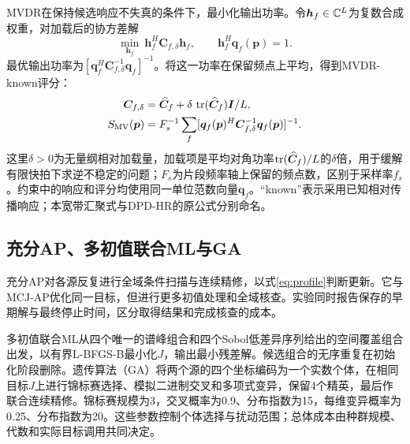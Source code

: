 MVDR在保持候选响应不失真的条件下，最小化输出功率\cite{Capon1969}。令$\bm h_f\in\mathbb C^L$为复数合成权重，对加载后的协方差解
\begin{equation}
 \min_{\bm h_f}\ \bm h_f^H\bm C_{f,\delta}\bm h_f,
 \qquad \bm h_f^H\bm q_f(\bm p)=1.\label{eq:mvdrConstraint}
\end{equation}
最优输出功率为$[\bm q_f^H\bm C_{f,\delta}^{-1}\bm q_f]^{-1}$。将这一功率在保留频点上平均，得到MVDR-known评分：
\begin{align}
 \bm C_{f,\delta}&=\widehat{\bm C}_f+
 \delta\,\operatorname{tr}(\widehat{\bm C}_f)\bm I/L,\nonumber\\
 S_{\mathrm{MV}}(\bm p)&=F_s^{-1}\sum_f
 [\bm q_f(\bm p)^H\bm C_{f,\delta}^{-1}\bm q_f(\bm p)]^{-1} .\label{eq:mvdr}
\end{align}
这里$\delta>0$为无量纲相对加载量，加载项是平均对角功率$\operatorname{tr}(\widehat{\bm C}_f)/L$的$\delta$倍，用于缓解有限快拍下求逆不稳定的问题；$F_s$为片段频率轴上保留的频点数，区别于采样率$f_s$。约束中的响应和评分均使用同一单位范数向量$\bm q_f$。“known”表示采用已知相对传播响应；本宽带汇聚式与DPD-HR的原公式分别命名\cite{TirerWeiss2016}。

\subsection{充分AP、多初值联合ML与GA}
充分AP对各源反复进行全域条件扫描与连续精修，以式\eqref{eq:profile}判断更新\cite{ChenHudsonYao2002}。它与MCJ-AP优化同一目标，但进行更多初值处理和全域核查。实验同时报告保存的早期解与最终停止时间，区分取得结果和完成核查的成本。

多初值联合ML从四个唯一的谱峰组合和四个Sobol低差异序列给出的空间覆盖组合出发，以有界L-BFGS-B最小化$J$，输出最小残差解。候选组合的无序重复在初始化阶段删除。遗传算法（GA）将两个源的四个坐标编码为一个实数个体，在相同目标$J$上进行锦标赛选择、模拟二进制交叉和多项式变异\cite{DebAgrawal1995}，保留4个精英，最后作联合连续精修。锦标赛规模为3，交叉概率为0.9、分布指数为15，每维变异概率为0.25、分布指数为20。这些参数控制个体选择与扰动范围；总体成本由种群规模、代数和实际目标调用共同决定。

